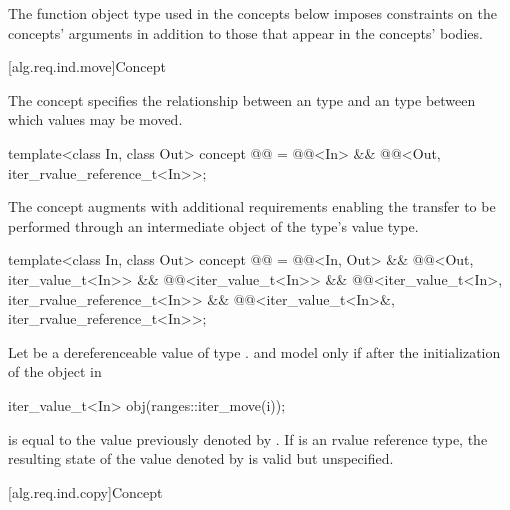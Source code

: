 \pnum
\begin{note}
The  function object type
used in the concepts below imposes constraints on the concepts' arguments
in addition to those that appear in the concepts' bodies.
\end{note}

[alg.req.ind.move]{Concept }

\pnum
The  concept specifies the relationship between
an  type and an  type
between which values may be moved.

\begin{codeblock}
template<class In, class Out>
  concept @@ =
    @@<In> &&
    @@<Out, iter_rvalue_reference_t<In>>;
\end{codeblock}

\pnum
The  concept augments
 with additional requirements enabling
the transfer to be performed through an intermediate object of the
 type's value type.

\begin{codeblock}
template<class In, class Out>
  concept @@ =
    @@<In, Out> &&
    @@<Out, iter_value_t<In>> &&
    @@<iter_value_t<In>> &&
    @@<iter_value_t<In>, iter_rvalue_reference_t<In>> &&
    @@<iter_value_t<In>&, iter_rvalue_reference_t<In>>;
\end{codeblock}

\pnum
Let  be a dereferenceable value of type .
 and  model 
only if after the initialization of the object  in
\begin{codeblock}
iter_value_t<In> obj(ranges::iter_move(i));
\end{codeblock}
 is equal to the value previously denoted by . If
 is an rvalue reference type,
the resulting state of the value denoted by  is
valid but unspecified.

[alg.req.ind.copy]{Concept }

